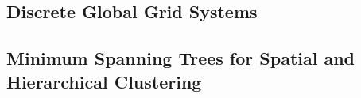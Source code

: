 \begin{multicols}{2}
\subsection{Discrete Global Grid Systems}

\subsection{Minimum Spanning Trees for Spatial and Hierarchical Clustering}







\end{multicols}
